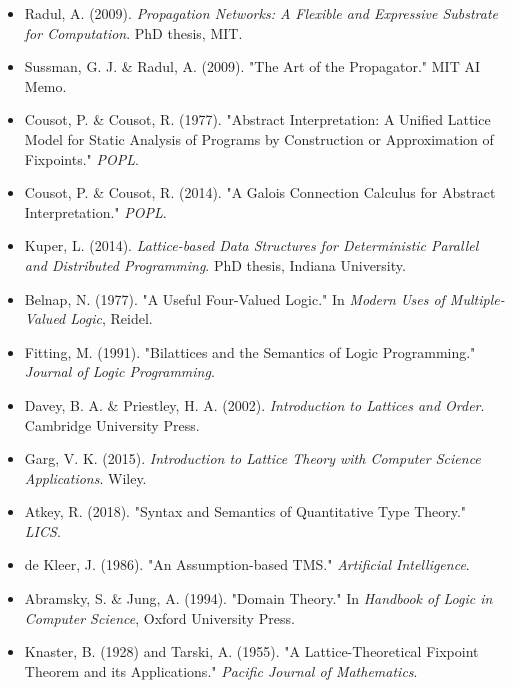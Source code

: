 \documentclass[11pt]{article}
\begin{document}
\begin{itemize}
\item Radul, A. (2009). \emph{Propagation Networks: A Flexible and Expressive Substrate for Computation}. PhD thesis, MIT.
\item Sussman, G. J. \& Radul, A. (2009). "The Art of the Propagator." MIT AI Memo.
\item Cousot, P. \& Cousot, R. (1977). "Abstract Interpretation: A Unified Lattice Model for Static Analysis of Programs by Construction or Approximation of Fixpoints." \emph{POPL}.
\item Cousot, P. \& Cousot, R. (2014). "A Galois Connection Calculus for Abstract Interpretation." \emph{POPL}.
\item Kuper, L. (2014). \emph{Lattice-based Data Structures for Deterministic Parallel and Distributed Programming}. PhD thesis, Indiana University.
\item Belnap, N. (1977). "A Useful Four-Valued Logic." In \emph{Modern Uses of Multiple-Valued Logic}, Reidel.
\item Fitting, M. (1991). "Bilattices and the Semantics of Logic Programming." \emph{Journal of Logic Programming}.
\item Davey, B. A. \& Priestley, H. A. (2002). \emph{Introduction to Lattices and Order}. Cambridge University Press.
\item Garg, V. K. (2015). \emph{Introduction to Lattice Theory with Computer Science Applications}. Wiley.
\item Atkey, R. (2018). "Syntax and Semantics of Quantitative Type Theory." \emph{LICS}.
\item de Kleer, J. (1986). "An Assumption-based TMS." \emph{Artificial Intelligence}.
\item Abramsky, S. \& Jung, A. (1994). "Domain Theory." In \emph{Handbook of Logic in Computer Science}, Oxford University Press.
\item Knaster, B. (1928) and Tarski, A. (1955). "A Lattice-Theoretical Fixpoint Theorem and its Applications." \emph{Pacific Journal of Mathematics}.
\end{itemize}
\end{document}

